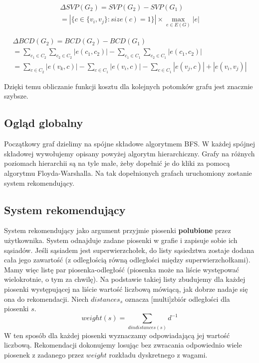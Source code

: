 \documentclass[a4paper,10pt]{article}
\begin{document}
\begin{equation}
\begin{split}
 \Delta SVP(G_2) = SVP(G_2) - SVP(G_1)\\
 = |\{c \in \{v_i, v_j\} : size(c) = 1\}| \times \max_{e \in E(G)} |e|
 \end{split}
\end{equation}

\begin{equation}
\begin{split}
 \Delta BCD(G_2) = BCD(G_2) - BCD(G_1)\\
 = \sum_{c_1 \in C_2} \sum_{c_2 \in C_2} |e(c_1, c_2)| - \sum_{c_1 \in C_1} \sum_{c_2 \in C_1} |e(c_1, c_2)|\\
 = \sum_{c \in C_2} |e(v_k, c)| - \sum_{c \in C_1} |e(v_i, c)| - \sum_{c \in C_1} |e(v_j, c)| + |e(v_i, v_j)|
 \end{split}
\end{equation}

Dzięki temu obliczanie funkcji kosztu dla kolejnych potomków grafu jest znacznie szybsze.

\subsection{Ogląd globalny}
Początkowy graf dzielimy na spójne składowe algorytmem BFS. W każdej spójnej składowej wywołujemy opisany powyżej algorytm hierarchiczny.
Grafy na różnych poziomach hierarchii są na tyle małe, żeby dopełnić je do kliki za pomocą algorytmu Floyda-Warshalla.
Na tak dopełnionych grafach uruchomiony zostanie system rekomendujący.

\subsection{System rekomendujący}
System rekomendujący jako argument przyjmie piosenki \textbf{polubione} przez użytkownika.
System odnajduje zadane piosenki w grafie i zapisuje sobie ich sąsiadów. 
Jeśli sąsiadem jest superwierzchołek, do listy sąsiedztwa zostaje dodana cała jego zawartość (z odległością równą odległości między superwierzchołkami).
Mamy więc listę par piosenka-odległość (piosenka może na liście występować wielokrotnie, o tym za chwilę).
Na podstawie takiej listy zbudujemy dla każdej piosenki występującej na liście wartość liczbową mówiącą, jak dobrze nadaje się ona do rekomendacji.
Niech $distances_{s}$ oznacza [multi]zbiór odległości dla piosenki $s$.
\begin{equation}
 weight(s) = \sum_{d in distances(s)} d^{-1}
\end{equation}
W ten sposób dla każdej piosenki wyznaczamy odpowiadającą jej wartość liczbową. 
Rekomendacji dokonujemy losując bez zwracania odpowiednio wiele piosenek z zadanego przez $weight$ rozkładu dyskretnego z wagami.
\end{document}
